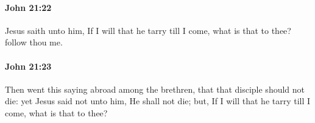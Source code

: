 		\paragraph{John 21:22} %
			\label{JOHN-21-22}

			Jesus saith unto him, If I will that he tarry till I come, what is that to thee? follow thou me.

			\begin{framed}
				\scriptsize
				\begin{compactdesc}
					\item[SBLG] 
				\end{compactdesc}
			\end{framed}

		\paragraph{John 21:23} %
			\label{JOHN-21-23}

			Then went this saying abroad among the brethren, that that disciple should not die: yet Jesus said not unto him, He shall not die; but, If I will that he tarry till I come, what is that to thee?

